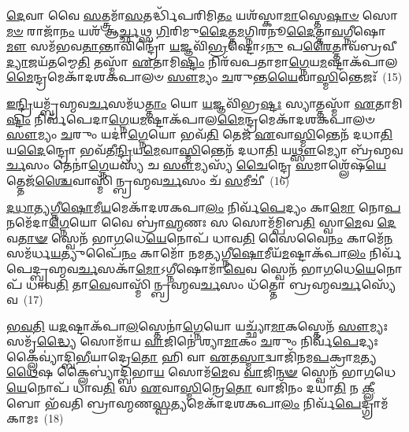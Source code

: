 {\anuvakamend[{\-\ul{𑌇}\-\-\ul{𑌨𑍍𑌦𑍍𑌰𑌿}\-𑌯𑍇॑\-𑌽\-\ul{𑌸𑍍𑌮𑌿}\-𑌨𑍍𑌭𑍂𑌮𑍍𑌯𑌾᳴ \ul{𑌏}\-𑌤𑌾𑌮𑌿\-\ul{𑌨𑍍𑌦𑍍𑌰𑌃} 𑌸𑍍𑌯𑌾𑌤𑍍𑌤\-\ul{𑌸𑍍𑌮𑍈} 𑌸𑍋𑌮𑍋᳴ 𑌬𑌹𑍁\-\ul{𑌰𑍂}\-𑌪𑌾 𑌹𑌿 \ul{𑌪}\-𑌶\-\ul{𑌵} 𑌏𑌕᳴𑌚𑌤𑍍𑌵𑌾𑌰𑌿𑍞𑌶𑌚𑍍𑌚}]}%

\-\ul{𑌦𑍇}\-𑌵𑌾 𑌵𑍈 \ul{𑌸}\-𑌤𑍍𑌤𑍍𑌰𑌮𑌾᳴\-\ul{𑌸}\-𑌤𑌰𑍍𑌦𑍍𑌧𑌿᳴𑌪𑌰𑌿𑌮𑌿\-\ul{𑌤𑌂} 𑌯𑌶᳴𑌸𑍍𑌕𑌾\-\ul{𑌮𑌾}\-𑌸𑍍𑌤𑍇\-\ul{𑌷𑌾}\-\-\ul{𑍞} 𑌸𑍋\-\ul{𑌮}\-\-\ul{𑍞} 𑌰𑌾𑌜𑌾᳴\-\ul{𑌨𑌂} 𑌯𑌶᳴ 𑌆\-\ul{𑌰𑍍𑌚𑍍𑌛}\-𑌥𑍍𑌸 \ul{𑌗𑌿}\-𑌰𑌿𑌮𑍁\-\ul{𑌦𑍈}\-𑌤𑍍𑌤\-\ul{𑌮}\-𑌗𑍍𑌨𑌿𑌰𑌨𑍂\-\ul{𑌦𑍈}\-𑌤𑍍𑌤𑌾\-\ul{𑌵}\-𑌗𑍍𑌨𑍀𑌷𑍋\-\ul{𑌮𑍗} 𑌸𑌮᳴𑌭𑌵\-\ul{𑌤𑌾}\-𑌨𑍍𑌤𑌾𑌵𑌿𑌨𑍍𑌦𑍍𑌰𑍋᳴ \ul{𑌯}\-𑌜𑍍𑌞𑌵𑌿᳴\-\ul{𑌭𑍍𑌰}\-𑌷𑍍𑌟𑍋\-𑌽\-\ul{𑌨𑍁} 𑌪\-\ul{𑌰𑍈}\-𑌤𑍍𑌤𑌾𑌵᳴𑌬𑍍𑌰𑌵𑍀\-\ul{𑌦𑍍𑌯𑌾}\-𑌜𑌯᳴\-\ul{𑌤}\-𑌮𑍍𑌮𑍇\-\ul{𑌤𑌿} 𑌤𑌸𑍍𑌮𑌾᳴ \ul{𑌏}\-𑌤𑌾𑌮𑌿\-\ul{𑌷𑍍𑌟𑌿𑌂} 𑌨𑌿𑌰᳴𑌵𑌪𑌤𑌾𑌮𑌾\-\ul{𑌗𑍍𑌨𑍇}\-𑌯\-\ul{𑌮}\-𑌷𑍍𑌟𑌾𑌕᳴𑌪𑌾𑌲\-\ul{𑌮𑍈}\-𑌨𑍍𑌦𑍍𑌰𑌮𑍇𑌕𑌾᳴\-𑌦𑌶\-𑌕𑌪𑌾𑌲𑍞 \ul{𑌸𑍗}\-𑌮𑍍𑌯𑌂 \ul{𑌚}\-𑌰𑍁𑌨𑍍𑌤\-\ul{𑌯𑍈}\-𑌵𑌾\-\ul{𑌸𑍍𑌮𑌿}\-𑌨𑍍𑌤𑍇𑌜𑌃᳴~(15)

\-\ul{𑌇}\-\-\ul{𑌨𑍍𑌦𑍍𑌰𑌿}\-𑌯𑌮𑍍𑌬𑍍𑌰᳴𑌹𑍍𑌮𑌵\-\ul{𑌰𑍍𑌚}\-𑌸𑌮᳴𑌧\-\ul{𑌤𑍍𑌤𑌾𑌂} 𑌯𑍋 \ul{𑌯}\-𑌜𑍍𑌞𑌵𑌿᳴𑌭𑍍𑌰\-\ul{𑌷𑍍𑌟𑌃} 𑌸𑍍𑌯𑌾𑌤𑍍𑌤𑌸𑍍𑌮𑌾᳴ \ul{𑌏}\-𑌤𑌾𑌮𑌿\-\ul{𑌷𑍍𑌟𑌿𑌂} 𑌨𑌿𑌰𑍍𑌵᳴𑌪𑍇𑌦𑌾\-\ul{𑌗𑍍𑌨𑍇}\-𑌯\-\ul{𑌮}\-𑌷𑍍𑌟𑌾𑌕᳴𑌪𑌾𑌲\-\ul{𑌮𑍈}\-𑌨𑍍𑌦𑍍𑌰𑌮𑍇𑌕𑌾᳴\-𑌦𑌶\-𑌕𑌪𑌾𑌲𑍞 \ul{𑌸𑍗}\-𑌮𑍍𑌯𑌂 \ul{𑌚}\-𑌰𑍁𑌂 𑌯𑌦𑌾॑\-\ul{𑌗𑍍𑌨𑍇}\-𑌯𑍋 𑌭𑌵᳴\-\ul{𑌤𑌿} 𑌤𑍇𑌜᳴ \ul{𑌏}\-𑌵𑌾\-\ul{𑌸𑍍𑌮𑌿}\-𑌨𑍍𑌤𑍇𑌨᳴ 𑌦𑌧𑌾\-\ul{𑌤𑌿} 𑌯\-\ul{𑌦𑍈}\-𑌨𑍍𑌦𑍍𑌰𑍋 𑌭𑌵᳴𑌤𑍀\-\ul{𑌨𑍍𑌦𑍍𑌰𑌿}\-𑌯\-\ul{𑌮𑍇}\-𑌵𑌾\-\ul{𑌸𑍍𑌮𑌿}\-𑌨𑍍𑌤𑍇𑌨᳴ 𑌦𑌧𑌾\-\ul{𑌤𑌿} 𑌯\-\ul{𑌥𑍍𑌸𑍗}\-𑌮𑍍𑌯𑍋 𑌬𑍍𑌰᳴𑌹𑍍𑌮𑌵\-\ul{𑌰𑍍𑌚}\-𑌸𑌂 𑌤𑍇𑌨𑌾॑\-\ul{𑌗𑍍𑌨𑍇}\-𑌯𑌸𑍍𑌯᳴ 𑌚 \ul{𑌸𑍗}\-𑌮𑍍𑌯𑌸𑍍𑌯᳴ \ul{𑌚𑍈}\-𑌨𑍍𑌦𑍍𑌰𑍇 \ul{𑌸}\-𑌮𑌾𑌶𑍍𑌲𑍇᳴𑌷\-\ul{𑌯𑍇}\-𑌤𑍍𑌤𑍇𑌜᳴\-\ul{𑌶𑍍𑌚𑍈}\-𑌵𑌾𑌸𑍍𑌮𑌿᳴𑌨𑍍𑌬𑍍𑌰𑌹𑍍𑌮𑌵\-\ul{𑌰𑍍𑌚}\-𑌸𑌂 𑌚᳴ \ul{𑌸}\-𑌮𑍀𑌚𑍀॑~(16)

\-\ul{𑌦}\-\-\ul{𑌧𑌾}\-\-\ul{𑌤𑍍𑌯}\-\-\ul{𑌗𑍍𑌨𑍀}\-\-\ul{𑌷𑍋}\-𑌮𑍀\-\ul{𑌯}\-𑌮𑍇𑌕𑌾᳴\-𑌦𑌶\-𑌕𑌪𑌾\-\ul{𑌲𑌂} 𑌨𑌿𑌰𑍍𑌵᳴\-\ul{𑌪𑍇}\-𑌦𑍍𑌯𑌂 𑌕𑌾\-\ul{𑌮𑍋} 𑌨𑍋\-\ul{𑌪}\-𑌨𑌮𑍇᳴𑌦𑌾\-\ul{𑌗𑍍𑌨𑍇}\-𑌯𑍋 𑌵𑍈 𑌬𑍍𑌰𑌾॑\-\ul{𑌹𑍍𑌮}\-𑌣𑌃 𑌸 𑌸𑍋𑌮᳴𑌮𑍍𑌪𑌿𑌬\-\ul{𑌤𑌿} 𑌸𑍍𑌵𑌾\-\ul{𑌮𑍇}\-𑌵 \ul{𑌦𑍇}\-𑌵\-\ul{𑌤𑌾}\-\-\ul{𑍟} 𑌸𑍍𑌵𑍇𑌨᳴ 𑌭𑌾\-\ul{𑌗}\-𑌧𑍇\-\ul{𑌯𑍇}\-𑌨𑍋𑌪᳴ 𑌧𑌾𑌵\-\ul{𑌤𑌿} 𑌸𑍈𑌵𑍈\-\ul{𑌨𑌂} 𑌕𑌾𑌮𑍇᳴\-\ul{𑌨} 𑌸𑌮᳴𑌰𑍍𑌧\-\ul{𑌯}\-𑌤𑍍𑌯𑍁𑌪𑍈᳴\-\ul{𑌨𑌂} 𑌕𑌾𑌮𑍋᳴ 𑌨𑌮𑌤𑍍𑌯𑌗𑍍𑌨𑍀\-\ul{𑌷𑍋}\-𑌮𑍀𑌯᳴\-\ul{𑌮}\-𑌷𑍍𑌟𑌾\-𑌕᳴𑌪𑌾\-\ul{𑌲𑌂} 𑌨𑌿𑌰𑍍𑌵᳴𑌪𑍇𑌦𑍍𑌬𑍍𑌰𑌹𑍍𑌮𑌵\-\ul{𑌰𑍍𑌚}\-𑌸𑌕𑌾᳴\-\ul{𑌮𑍋}\-\-𑌽𑌗𑍍𑌨𑍀𑌷𑍋𑌮𑌾᳴\-\ul{𑌵𑍇}\-𑌵 𑌸𑍍𑌵𑍇𑌨᳴ 𑌭𑌾\-\ul{𑌗}\-𑌧𑍇\-\ul{𑌯𑍇}\-𑌨𑍋𑌪᳴ 𑌧𑌾𑌵\-\ul{𑌤𑌿} 𑌤𑌾\-\ul{𑌵𑍇}\-𑌵𑌾𑌸𑍍𑌮𑌿᳴𑌨𑍍𑌬𑍍𑌰𑌹𑍍𑌮𑌵\-\ul{𑌰𑍍𑌚}\-𑌸𑌂 𑌧᳴𑌤𑍍𑌤𑍋 𑌬𑍍𑌰𑌹𑍍𑌮𑌵\-\ul{𑌰𑍍𑌚}\-𑌸𑍍𑌯𑍇᳴𑌵~(17)

\-\ul{𑌭}\-\-\ul{𑌵}\-\-\ul{𑌤𑌿} 𑌯\-\ul{𑌦}\-𑌷𑍍𑌟𑌾𑌕᳴𑌪𑌾\-\ul{𑌲}\-𑌸𑍍𑌤𑍇𑌨𑌾॑\-\ul{𑌗𑍍𑌨𑍇}\-𑌯𑍋 𑌯𑌚𑍍𑌛𑍍𑌯𑌾᳴\-\ul{𑌮𑌾}\-𑌕𑌸𑍍𑌤𑍇𑌨᳴ \ul{𑌸𑍗}\-𑌮𑍍𑌯𑌃 𑌸𑌮𑍃᳴\-\ul{𑌦𑍍𑌧𑍍𑌯𑍈} 𑌸𑍋𑌮𑌾᳴𑌯 \ul{𑌵𑌾}\-𑌜𑌿𑌨𑍇॑ 𑌶𑍍𑌯𑌾\-\ul{𑌮𑌾}\-𑌕𑌂 \ul{𑌚}\-𑌰𑍁𑌂 𑌨𑌿𑌰𑍍𑌵᳴\-\ul{𑌪𑍇}\-𑌦𑍍𑌯𑌃 𑌕𑍍𑌲𑍈𑌵𑍍𑌯𑌾॑𑌦𑍍𑌬𑌿\-\ul{𑌭𑍀}\-𑌯𑌾𑌦𑍍𑌰𑍇\-\ul{𑌤𑍋} 𑌹𑌿 𑌵𑌾 \ul{𑌏}\-𑌤\-\ul{𑌸𑍍𑌮𑌾}\-𑌦𑍍𑌵𑌾𑌜𑌿᳴𑌨𑌮\-\ul{𑌪}\-𑌕𑍍𑌰𑌾\-\ul{𑌮}\-𑌤𑍍𑌯\-\ul{𑌥𑍈}\-𑌷 𑌕𑍍𑌲𑍈𑌬𑍍𑌯𑌾॑𑌦𑍍𑌬𑌿𑌭𑌾\-\ul{𑌯} 𑌸𑍋𑌮᳴\-\ul{𑌮𑍇}\-𑌵 \ul{𑌵𑌾}\-𑌜𑌿\-\ul{𑌨}\-\-\ul{𑍟} 𑌸𑍍𑌵𑍇𑌨᳴ 𑌭𑌾\-\ul{𑌗}\-𑌧𑍇\-\ul{𑌯𑍇}\-𑌨𑍋𑌪᳴ 𑌧𑌾𑌵\-\ul{𑌤𑌿} 𑌸 \ul{𑌏}\-𑌵𑌾\-\ul{𑌸𑍍𑌮𑌿}\-𑌨𑍍𑌰𑍇\-\ul{𑌤𑍋} 𑌵𑌾𑌜𑌿᳴𑌨𑌂 𑌦𑌧𑌾\-\ul{𑌤𑌿} 𑌨 \ul{𑌕𑍍𑌲𑍀}\-𑌬𑍋 𑌭᳴𑌵𑌤𑌿 𑌬𑍍𑌰𑌾𑌹𑍍𑌮𑌣\-\ul{𑌸𑍍𑌪}\-𑌤𑍍𑌯𑌮𑍇𑌕𑌾᳴\-𑌦𑌶\-𑌕𑌪𑌾\-\ul{𑌲𑌂} 𑌨𑌿𑌰𑍍𑌵᳴\-\ul{𑌪𑍇}\-𑌦𑍍𑌗𑍍𑌰𑌾𑌮᳴𑌕𑌾𑌮𑌃~(18)

